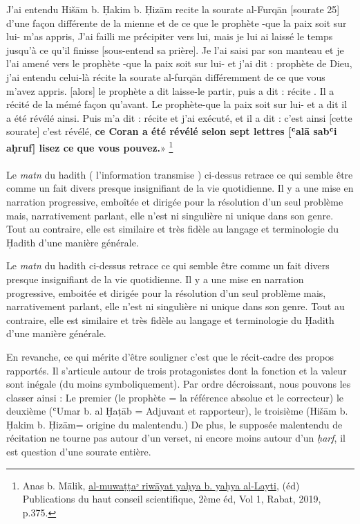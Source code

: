 \documentclass[a4paper,12pt]{report}
\begin{document}
\begin{itemize}
J’ai entendu Hišām b. Ḥakim b. Ḥizām  recite la sourate al-Furqān [sourate 25] d’une façon différente de la mienne et de ce que le prophète -que la paix soit sur lui- m’as appris, J’ai failli me précipiter vers lui, mais je lui ai laissé le temps jusqu’à ce qu’il finisse [sous-entend sa prière]. Je l’ai saisi par son manteau et  je l’ai amené vers le prophète -que la paix soit sur lui- et j’ai dit : prophète de Dieu, j’ai entendu celui-là récite la sourate al-furqān différemment de ce que vous m’avez appris. [alors] le prophète a dit laisse-le partir, puis a dit : récite . Il a récité de la mémé façon qu’avant. Le prophète-que la paix soit sur lui- et a dit il a été révélé ainsi. Puis m’a dit : récite et j’ai exécuté, et il a dit : c’est ainsi [cette sourate] c’est révélé, \textbf{ce Coran a été révélé selon sept lettres [ʿalā sabʿi aḥruf]  lisez ce que vous pouvez.}» \footnote{Anas b. Mālik, \underline { al-muwaṭṭaᵓ riwāyat yaḥya b. yaḥya al-Layṯi}, (éd) Publications du haut conseil scientifique, 2ème éd, Vol 1,  Rabat, 2019, p.375.}  
\paragraph{}
 Le \textit{matn }du hadith ( l’information transmise ) ci-dessus retrace ce qui semble être comme un fait divers presque insignifiant de la vie quotidienne. Il y a une mise en narration progressive, emboîtée et dirigée pour la résolution d’un seul problème mais, narrativement parlant, elle n’est ni singulière ni unique dans son genre. Tout au contraire, elle est similaire et très fidèle au langage et terminologie du Ḥadith d’une manière générale.  


     Le \textit{matn} du hadith  ci-dessus retrace ce qui semble être comme un fait divers presque insignifiant de la vie quotidienne. Il y a une mise en narration progressive, emboitée et dirigée pour la résolution d’un seul problème mais, narrativement parlant, elle n’est ni singulière ni unique dans son genre. Tout au contraire, elle est similaire et très fidèle au langage et terminologie du Ḥadith d’une manière générale.  

En revanche, ce qui  mérite  d’être souligner c’est que  le récit-cadre des propos rapportés. Il  s’articule autour de trois protagonistes dont la fonction et la valeur sont inégale (du moins symboliquement). Par ordre décroissant, nous pouvons les classer ainsi : Le premier (le prophète = la référence absolue et le correcteur) le deuxième (ʿUmar b. al Ḫaṭāb =  Adjuvant et rapporteur), le troisième  (Hišām b. Ḥakim b. Ḥizām= origine du malentendu.) De plus, le supposée malentendu de récitation  ne tourne pas autour d’un verset, ni encore moins autour d’un \textit{ḥarf}, il est question d’une sourate entière.  


\end{itemize}
\end{document}
